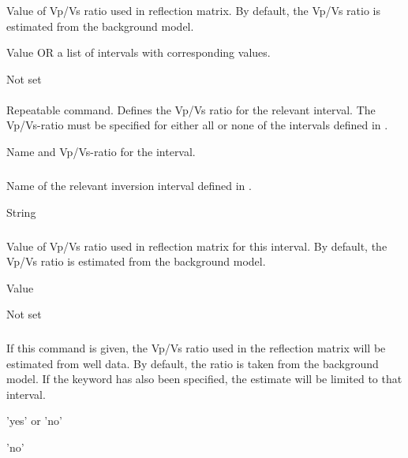 \subsubsection{}
 \slist
   \item \Description Value of Vp/Vs ratio used in reflection
     matrix. By default, the Vp/Vs ratio is estimated from the
     background model.
   \item \Argument Value OR a list of intervals with corresponding values.
   \item \Default Not set
   \elist

\paragraph{}
 \slist
   \item \Description Repeatable command. Defines the Vp/Vs ratio for the relevant interval. The Vp/Vs-ratio must be specified for either all or none of the intervals defined in .
   \item \Argument Name and Vp/Vs-ratio for the interval.
   \item \Default
 \elist

\subparagraph{}
 \slist
   \item \Description Name of the relevant inversion interval defined in .
   \item \Argument String
   \item \Default
 \elist

 \subparagraph{}
 \slist
   \item \Description Value of Vp/Vs ratio used in reflection
     matrix for this interval. By default, the Vp/Vs ratio is estimated from the
     background model.
   \item \Argument Value
   \item \Default Not set
   \elist

\subsubsection{}
 \slist
   \item \Description If this command is given, the Vp/Vs ratio used
     in the reflection matrix will be estimated from well data. By
     default, the ratio is taken from the background model. If the
     keyword  has also been specified,
     the estimate will be limited to that interval.
   \item \Argument 'yes' or 'no'
   \item \Default 'no'
   \elist

